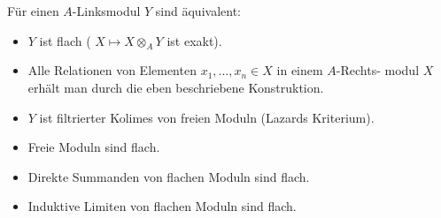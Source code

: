 \documentclass{cheat-sheet}
\begin{document}
\begin{lem}
  Für einen $A$-Linksmodul $Y$ sind äquivalent:
  \begin{itemize}
    \item $Y$ ist flach (\dh{} $X \mapsto X \otimes_A Y$ ist exakt).
    \item Alle Relationen von Elementen $x_1, \ldots, x_n \in X$ in einem $A$-Rechts- modul $X$ erhält man durch die eben beschriebene Konstruktion.
    \item $Y$ ist filtrierter Kolimes von freien Moduln (Lazards Kriterium).
  \end{itemize}
\end{lem}

\begin{lem}
  \begin{itemize}
    \item Freie Moduln sind flach.
    \item Direkte Summanden von flachen Moduln sind flach.
    \item Induktive Limiten von flachen Moduln sind flach.
  \end{itemize}
\end{lem}
\end{document}
